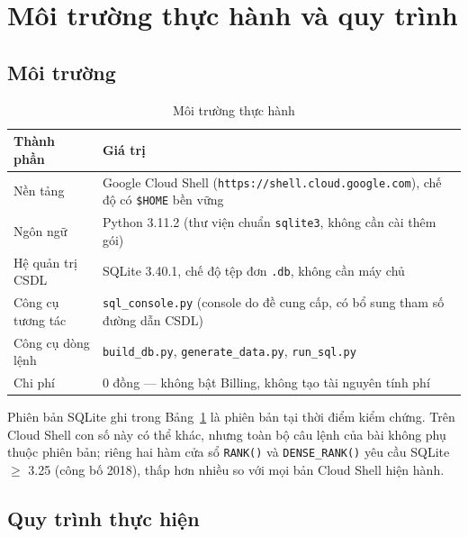 \documentclass[12pt,a4paper]{article}
\newcommand{\code}[1]{\texttt{\small #1}}
\begin{document}
\section{Môi trường thực hành và quy trình}

\subsection{Môi trường}

\begin{table}[H]
\centering
\caption{Môi trường thực hành}
\label{tab:env}
\small
\begin{tabularx}{\linewidth}{@{}l X@{}}
\toprule
\textbf{Thành phần} & \textbf{Giá trị} \\
\midrule
Nền tảng          & Google Cloud Shell (\code{https://shell.cloud.google.com}), chế độ có \code{\$HOME} bền vững \\
Ngôn ngữ          & Python 3.11.2 (thư viện chuẩn \code{sqlite3}, không cần cài thêm gói) \\
Hệ quản trị CSDL  & SQLite 3.40.1, chế độ tệp đơn \code{.db}, không cần máy chủ \\
Công cụ tương tác & \code{sql\_console.py} (console do đề cung cấp, có bổ sung tham số đường dẫn CSDL) \\
Công cụ dòng lệnh & \code{build\_db.py}, \code{generate\_data.py}, \code{run\_sql.py} \\
Chi phí           & 0 đồng --- không bật Billing, không tạo tài nguyên tính phí \\
\bottomrule
\end{tabularx}
\end{table}

Phiên bản SQLite ghi trong Bảng~\ref{tab:env} là phiên bản tại thời điểm kiểm chứng. Trên Cloud
Shell con số này có thể khác, nhưng toàn bộ câu lệnh của bài không phụ thuộc phiên bản; riêng
hai hàm cửa sổ \code{RANK()} và \code{DENSE\_RANK()} yêu cầu SQLite $\geq$ 3.25 (công bố 2018),
thấp hơn nhiều so với mọi bản Cloud Shell hiện hành.

\subsection{Quy trình thực hiện}
\end{document}
